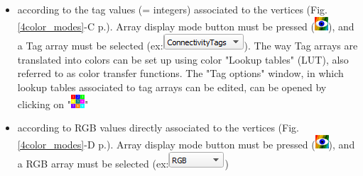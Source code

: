 \begin{itemize}
\item according to the tag values (= integers) associated to the vertices (Fig. \ref{4color_modes}-C p.\pageref{4color_modes}). Array display mode button must be pressed (\includegraphics[scale=0.7]{images/04/show_color_scale.png}), and a Tag array must be selected (ex:\includegraphics[scale=0.5]{images/04/scalarcombo_tag.png}). The way Tag arrays are translated into colors can be set up using color "Lookup tables" (LUT), also referred to as color transfer functions. The "Tag options" window, in which lookup tables associated to tag arrays can be edited, can be opened by clicking on "\includegraphics[scale=0.7]{images/04/tag_edit.png}"
\item	according to RGB values directly associated to the vertices (Fig. \ref{4color_modes}-D p.\pageref{4color_modes}). Array display mode button must be pressed (\includegraphics[scale=0.7]{images/04/show_color_scale.png}), and a RGB array must be selected (ex:\includegraphics[scale=0.5]{images/04/scalarcombo_rgb.png}) 
\end{itemize}

